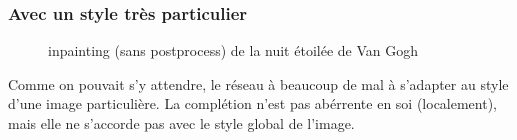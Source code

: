 \documentclass[12pt]{article}
\begin{document}
\newpage

\subsubsection*{Avec un style très particulier}
\begin{figure}[htb]
\centering
  \hfill
  \hfill
  \hfill
\end{figure}
\begin{figure}[htb]
\centering
  \hfill
  \hfill
  \hfill
  \caption{inpainting (sans postprocess) de la nuit étoilée de Van Gogh}\label{fig:occlus_dynamic}
\end{figure}


Comme on pouvait s'y attendre, le réseau à beaucoup de mal à s'adapter au style d'une image particulière. La complétion n'est pas abérrente en soi (localement), mais elle ne s'accorde pas avec le style global de l'image.

\newpage



\end{document}

